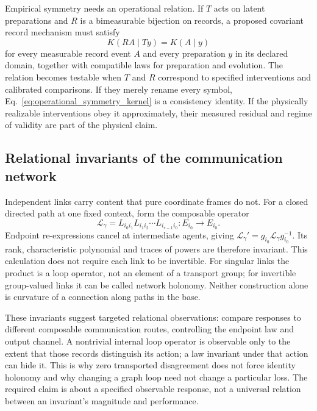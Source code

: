 Empirical symmetry needs an operational relation. If $T$ acts on latent preparations and $R$ is a bimeasurable bijection on records, a proposed covariant record mechanism must satisfy
\begin{equation}
K(RA\mid Ty)=K(A\mid y)
\label{eq:operational_symmetry_kernel}
\end{equation}
for every measurable record event $A$ and every preparation $y$ in its declared domain, together with compatible laws for preparation and evolution. The relation becomes testable when $T$ and $R$ correspond to specified interventions and calibrated comparisons. If they merely rename every symbol, Eq.~\eqref{eq:operational_symmetry_kernel} is a consistency identity. If the physically realizable interventions obey it approximately, their measured residual and regime of validity are part of the physical claim.

\subsection{Relational invariants of the communication network}

Independent links carry content that pure coordinate frames do not. For a closed directed path at one fixed context, form the composable operator
\begin{equation}
\mathcal L_\gamma=L_{i_0i_1}L_{i_1i_2}\cdots L_{i_{r-1}i_0}:E_{i_0}\longrightarrow E_{i_0}.
\label{eq:science_loop_operator}
\end{equation}
Endpoint re-expressions cancel at intermediate agents, giving $\mathcal L_\gamma'=g_{i_0}\mathcal L_\gamma g_{i_0}^{-1}$. Its rank, characteristic polynomial and traces of powers are therefore invariant. This calculation does not require each link to be invertible. For singular links the product is a loop operator, not an element of a transport group; for invertible group-valued links it can be called network holonomy. Neither construction alone is curvature of a connection along paths in the base.

These invariants suggest targeted relational observations: compare responses to different composable communication routes, controlling the endpoint law and output channel. A nontrivial internal loop operator is observable only to the extent that those records distinguish its action; a law invariant under that action can hide it. This is why zero transported disagreement does not force identity holonomy and why changing a graph loop need not change a particular loss. The required claim is about a specified observable response, not a universal relation between an invariant's magnitude and performance.

